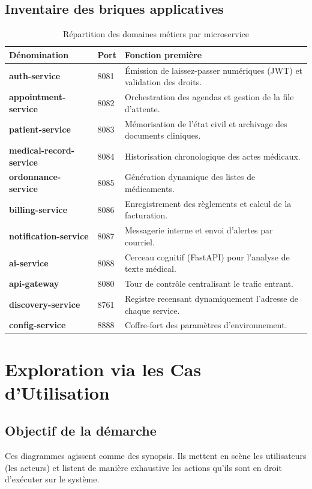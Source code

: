 \documentclass[final]{report}
\begin{document}
\subsection{Inventaire des briques applicatives}
\begin{table}[H]
\centering
\caption{Répartition des domaines métiers par microservice}
\renewcommand{\arraystretch}{1.4}
\begin{tabularx}{\textwidth}{|>{\bfseries\ttfamily}p{4cm}|p{1.5cm}|X|}
\hline
\textbf{Dénomination} & \textbf{Port} & \textbf{Fonction première} \\
\hline
auth-service & 8081 & Émission de laissez-passer numériques (JWT) et validation des droits. \\
\hline
appointment-service & 8082 & Orchestration des agendas et gestion de la file d'attente. \\
\hline
patient-service & 8083 & Mémorisation de l'état civil et archivage des documents cliniques. \\
\hline
medical-record-service & 8084 & Historisation chronologique des actes médicaux. \\
\hline
ordonnance-service & 8085 & Génération dynamique des listes de médicaments. \\
\hline
billing-service & 8086 & Enregistrement des règlements et calcul de la facturation. \\
\hline
notification-service & 8087 & Messagerie interne et envoi d'alertes par courriel. \\
\hline
ai-service & 8088 & Cerceau cognitif (FastAPI) pour l'analyse de texte médical. \\
\hline
api-gateway & 8080 & Tour de contrôle centralisant le trafic entrant. \\
\hline
discovery-service & 8761 & Registre recensant dynamiquement l'adresse de chaque service. \\
\hline
config-service & 8888 & Coffre-fort des paramètres d'environnement. \\
\hline
\end{tabularx}
\end{table}
 
\section{Exploration via les Cas d'Utilisation}
\subsection{Objectif de la démarche}
Ces diagrammes agissent comme des synopsis. Ils mettent en scène les utilisateurs (les acteurs) et listent de manière exhaustive les actions qu'ils sont en droit d'exécuter sur le système.
 
\end{document}
